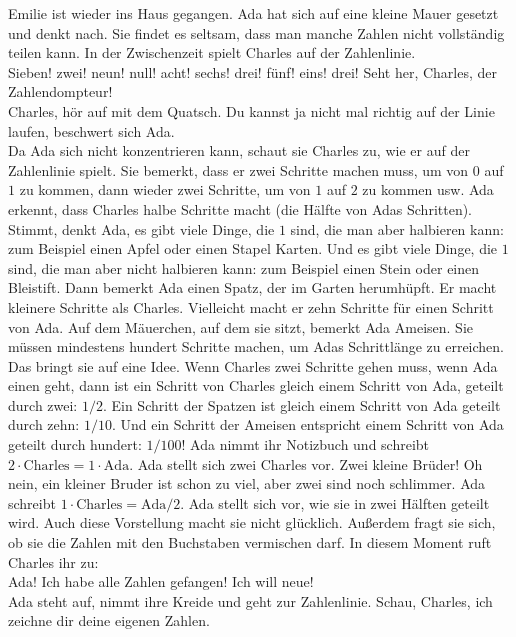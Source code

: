 Emilie ist wieder ins Haus gegangen. 
Ada hat sich auf eine kleine Mauer gesetzt und denkt nach. 
Sie findet es seltsam, dass man manche Zahlen nicht vollständig teilen kann. 
In der Zwischenzeit spielt Charles auf der Zahlenlinie. \\
\frqq{}Sieben! zwei! neun! null! acht! sechs! drei! fünf! eins! drei! Seht her, Charles, der Zahlendompteur!\flqq{}\\
\frqq{}Charles, hör auf mit dem Quatsch. Du kannst ja nicht mal richtig auf der Linie laufen\flqq{}, beschwert sich Ada.\\
Da Ada sich nicht konzentrieren kann, schaut sie Charles zu, wie er auf der Zahlenlinie spielt. Sie bemerkt, dass er zwei Schritte machen muss, um von $0$ auf $1$ zu kommen, dann wieder zwei Schritte, um von $1$ auf $2$ zu kommen usw. Ada erkennt, dass Charles halbe Schritte macht (die Hälfte von Adas Schritten). 
Stimmt, denkt Ada, es gibt viele Dinge, die $1$ sind, die man aber halbieren kann: zum Beispiel einen Apfel oder einen Stapel Karten. Und es gibt viele Dinge, die $1$ sind, die man aber nicht halbieren kann: zum Beispiel einen Stein oder einen Bleistift.
Dann bemerkt Ada einen Spatz, der im Garten herumhüpft. Er macht kleinere Schritte als Charles. Vielleicht macht er zehn Schritte für einen Schritt von Ada. Auf dem Mäuerchen, auf dem sie sitzt, bemerkt Ada Ameisen. Sie müssen mindestens hundert Schritte machen, um Adas Schrittlänge zu erreichen.
Das bringt sie auf eine Idee. Wenn Charles zwei Schritte gehen muss, wenn Ada einen geht, dann ist ein Schritt von Charles gleich einem Schritt von Ada, geteilt durch zwei: $1/2$. Ein Schritt der Spatzen ist gleich einem Schritt von Ada geteilt durch zehn: $1/10$. Und ein Schritt der Ameisen entspricht einem Schritt von Ada geteilt durch hundert: $1/100$!
Ada nimmt ihr Notizbuch und schreibt $2 \cdot \mathrm{Charles} = 1 \cdot \mathrm{Ada}$. Ada stellt sich zwei Charles vor. Zwei kleine Brüder! Oh nein, ein kleiner Bruder ist schon zu viel, aber zwei sind noch schlimmer. Ada schreibt $1 \cdot \mathrm{Charles} = \mathrm{Ada} / 2$. Ada stellt sich vor, wie sie in zwei Hälften geteilt wird. Auch diese Vorstellung macht sie nicht glücklich. Außerdem fragt sie sich, ob sie die Zahlen mit den Buchstaben vermischen darf.
In diesem Moment ruft Charles ihr zu:\\
\frqq{}Ada! Ich habe alle Zahlen gefangen! Ich will neue!\flqq{} \\
Ada steht auf, nimmt ihre Kreide und geht zur Zahlenlinie.
\frqq{}Schau, Charles, ich zeichne dir deine eigenen Zahlen.\flqq{}\\

